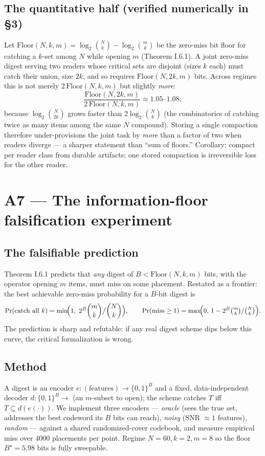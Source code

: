 \documentclass[11pt,a4paper]{article}
\begin{document}
\subsection{The quantitative half (verified numerically in \S3)}
\begin{claim}
Let $\mathrm{Floor}(N,k,m)=\log_2\binom{N}{k}-\log_2\binom{m}{k}$ be the zero-miss bit floor for catching a $k$-set among $N$ while opening $m$ (Theorem I.6.1). A joint zero-miss digest serving two readers whose critical sets are disjoint (sizes $k$ each) must catch their union, size $2k$, and so requires $\mathrm{Floor}(N,2k,m)$ bits. Across regimes this is not merely $2\,\mathrm{Floor}(N,k,m)$ but slightly \emph{more}:
\[
\frac{\mathrm{Floor}(N,2k,m)}{2\,\mathrm{Floor}(N,k,m)} \approx 1.05\text{--}1.08,
\]
because $\log_2\binom{N}{2k}$ grows faster than $2\log_2\binom{N}{k}$ (the combinatorics of catching twice as many items among the same $N$ compound). Storing a single compaction therefore under-provisions the joint task by \emph{more} than a factor of two when readers diverge --- a sharper statement than ``sum of floors.'' Corollary: compact per reader class from durable artifacts; one stored compaction is irreversible loss for the other reader.
\end{claim}

\section{A7 --- The information-floor falsification experiment}
\subsection{The falsifiable prediction}
Theorem I.6.1 predicts that \emph{any} digest of $B<\mathrm{Floor}(N,k,m)$ bits, with the operator opening $m$ items, must miss on some placement. Restated as a frontier: the best achievable zero-miss probability for a $B$-bit digest is
\[
\Pr(\text{catch all }k) = \min\!\Bigl(1,\; 2^{B}\binom{m}{k}\big/\binom{N}{k}\Bigr),
\qquad
\Pr(\text{miss}\ge1)=\max\!\Bigl(0,\,1-2^{B}\tbinom{m}{k}/\tbinom{N}{k}\Bigr).
\]
The prediction is sharp and refutable: if any real digest scheme dips below this curve, the critical formalization is wrong.

\subsection{Method}
A digest is an encoder $e:(\text{features})\to\{0,1\}^B$ and a fixed, data-independent decoder $d:\{0,1\}^B\to$ (an $m$-subset to open); the scheme catches $T$ iff $T\subseteq d(e(\cdot))$. We implement three encoders --- \emph{oracle} (sees the true set, addresses the best codeword its $B$ bits can reach), \emph{noisy} (SNR $\approx 1$ features), \emph{random} --- against a shared randomized-cover codebook, and measure empirical miss over $4000$ placements per point. Regime $N=60,k=2,m=8$ so the floor $B^\star=5.98$ bits is fully sweepable.
\end{document}
